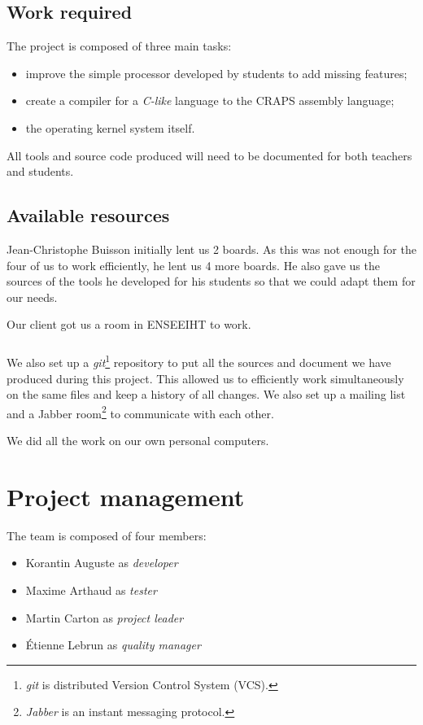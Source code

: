 \documentclass[openany]{book}
\begin{document}
    \section{Work required}
      The project is composed of three main tasks:
      \begin{itemize}
        \item improve the simple processor developed by students to add missing
          features;
        \item create a compiler for a \textit{C-like} language to the CRAPS
          assembly language;
        \item the operating kernel system itself.
      \end{itemize}

      All tools and source code produced will need to be documented for both
      teachers and students.

    \section{Available resources}
      Jean-Christophe Buisson initially lent us 2 boards. As this was not enough
      for the four of us to work efficiently, he lent us 4 more boards.
      He also gave us the sources of the tools he developed for his students so
      that we could adapt them for our needs.

      Our client got us a room in ENSEEIHT to work.

      \paragraph{}
      We also set up a \textit{git}\footnote{\textit{git} is distributed Version
      Control System (VCS).} repository to put all the sources and document we
      have produced during this project. This allowed us to efficiently work
      simultaneously on the same files and keep a history of all changes.
      We also set up a mailing list and a Jabber room\footnote{\textit{Jabber}
      is an instant messaging protocol.} to communicate with each other.

      We did all the work on our own personal computers.

  \chapter{Project management}
    The team is composed of four members:
    \begin{itemize}
      \item Korantin Auguste as \textit{developer}
      \item Maxime Arthaud as \textit{tester}
      \item Martin Carton as \textit{project leader}
      \item Étienne Lebrun as \textit{quality manager}
    \end{itemize}
\end{document}
